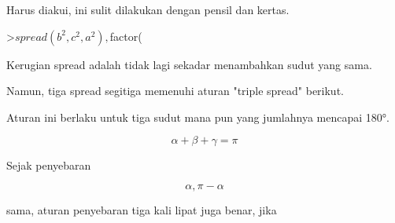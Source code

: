 \documentclass[a4paper,10pt]{article}
\begin{document}
\begin{eulernotebook}
\begin{eulercomment}
\begin{eulercomment}
\begin{eulercomment}
\begin{eulercomment}
\begin{eulercomment}
\begin{eulercomment}
\begin{eulercomment}
\begin{eulercomment}
\begin{eulercomment}
\begin{eulercomment}
\begin{eulercomment}
\begin{eulercomment}
\begin{eulercomment}
\begin{eulercomment}
\begin{eulercomment}
\begin{eulercomment}
\begin{eulercomment}
\begin{eulercomment}
\begin{eulercomment}
\begin{eulercomment}
\begin{eulercomment}
\begin{eulercomment}
\begin{eulercomment}
\begin{eulercomment}
\begin{eulercomment}
\begin{eulercomment}
\begin{eulercomment}
\begin{eulercomment}
\begin{eulercomment}
\begin{eulercomment}
\begin{eulercomment}
\begin{eulercomment}
\begin{eulercomment}
\begin{eulercomment}
\begin{eulercomment}
\begin{eulercomment}
\begin{eulercomment}
\begin{eulercomment}
\begin{eulercomment}
\begin{eulercomment}
\begin{eulercomment}
Harus diakui, ini sulit dilakukan dengan pensil dan kertas.
\end{eulercomment}
\begin{eulerprompt}
>$spread(b^2,c^2,a^2), $factor(%
\end{eulerprompt}
\begin{eulercomment}
Kerugian spread adalah tidak lagi sekadar menambahkan sudut yang sama.

Namun, tiga spread segitiga memenuhi aturan "triple spread" berikut.
\end{eulercomment}
\begin{eulercomment}
Aturan ini berlaku untuk tiga sudut mana pun yang jumlahnya mencapai
180°.\\
\end{eulercomment}
\begin{eulerformula}
\[
\alpha+\beta+\gamma=\pi
\]
\end{eulerformula}
\begin{eulercomment}
Sejak penyebaran

\end{eulercomment}
\begin{eulerformula}
\[
\alpha, \pi-\alpha
\]
\end{eulerformula}
\begin{eulercomment}
sama, aturan penyebaran tiga kali lipat juga benar, jika


\end{eulercomment}
\end{eulercomment}
\end{eulercomment}
\end{eulercomment}
\end{eulercomment}
\end{eulercomment}
\end{eulercomment}
\end{eulercomment}
\end{eulercomment}
\end{eulercomment}
\end{eulercomment}
\end{eulercomment}
\end{eulercomment}
\end{eulercomment}
\end{eulercomment}
\end{eulercomment}
\end{eulercomment}
\end{eulercomment}
\end{eulercomment}
\end{eulercomment}
\end{eulercomment}
\end{eulercomment}
\end{eulercomment}
\end{eulercomment}
\end{eulercomment}
\end{eulercomment}
\end{eulercomment}
\end{eulercomment}
\end{eulercomment}
\end{eulercomment}
\end{eulercomment}
\end{eulercomment}
\end{eulercomment}
\end{eulercomment}
\end{eulercomment}
\end{eulercomment}
\end{eulercomment}
\end{eulercomment}
\end{eulercomment}
\end{eulercomment}
\end{eulercomment}
\end{eulernotebook}
\end{document}
